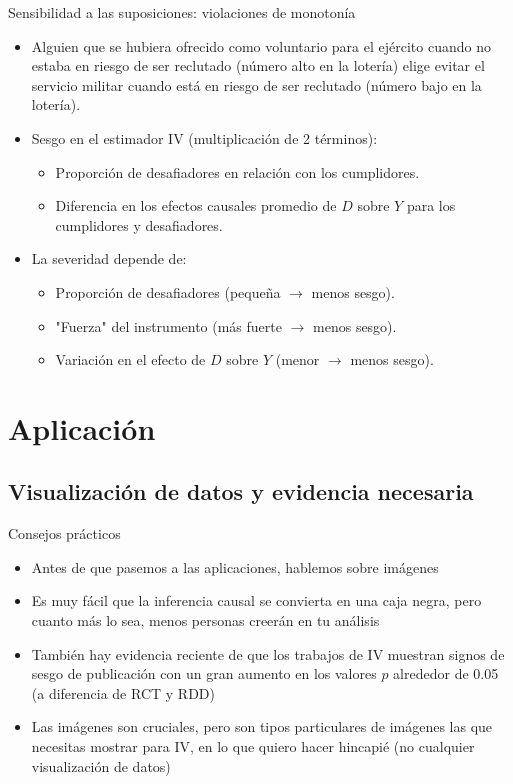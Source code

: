 \documentclass{beamer}
\begin{document}
\begin{frame}{Sensibilidad a las suposiciones: violaciones de monotonía}

\begin{itemize}

\item Alguien que se hubiera ofrecido como voluntario para el ejército cuando no estaba en riesgo de ser reclutado (número alto en la lotería) elige evitar el servicio militar cuando está en riesgo de ser reclutado (número bajo en la lotería).
	
\item Sesgo en el estimador IV (multiplicación de 2 términos):
		\begin{itemize}
		\item Proporción de desafiadores en relación con los cumplidores.
		\item Diferencia en los efectos causales promedio de $D$ sobre $Y$ para los cumplidores y desafiadores.
		\end{itemize}
\item La severidad depende de:
		\begin{itemize}
		\item Proporción de desafiadores (pequeña $\rightarrow$ menos sesgo).
		\item "Fuerza" del instrumento (más fuerte $\rightarrow$ menos sesgo).
		\item Variación en el efecto de $D$ sobre $Y$ (menor $\rightarrow$ menos sesgo).
		\end{itemize}
\end{itemize}
		
\end{frame}


	
		\section{Aplicación}

\subsection{Visualización de datos y evidencia necesaria}

\begin{frame}{Consejos prácticos}

\begin{itemize}
\item Antes de que pasemos a las aplicaciones, hablemos sobre imágenes
\item Es muy fácil que la inferencia causal se convierta en una caja negra, pero cuanto más lo sea, menos personas creerán en tu análisis
\item También hay evidencia reciente de que los trabajos de IV muestran signos de sesgo de publicación con un gran aumento en los valores $p$ alrededor de 0.05 (a diferencia de RCT y RDD)
\item Las imágenes son cruciales, pero son tipos particulares de imágenes las que necesitas mostrar para IV, en lo que quiero hacer hincapié (no cualquier visualización de datos)
\end{itemize}

\end{frame}
\end{document}
